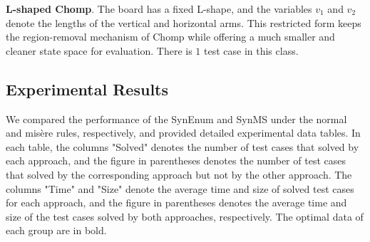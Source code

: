 \documentclass[review]{elsarticle}
\newcommand{\set}[1]{\{ #1 \}}
\newcommand{\tuple}[1]{\langle {#1} \rangle}
\newcommand{\true}{\top}
\newcommand{\statevar}{\mathcal{X}}
\newcommand{\act}{\mathcal{A}}
\newcommand{\constraint}{\mathcal{C}}
\newcommand{\estate}{\mathcal{E}}
\newcommand{\pre}{\mathtt{pre}}
\newcommand{\eff}{\mathtt{eff}}
\begin{document}
{\color{red}\textbf{L-shaped Chomp}. The board has a fixed L-shape, and the variables $v_1$ and $v_2$ denote the lengths of the vertical and horizontal arms.}
{\color{red}This restricted form keeps the region-removal mechanism of Chomp while offering a much smaller and cleaner state space for evaluation.}
{\color{red}There is $1$ test case in this class.}

\subsection{Experimental Results}
We compared the performance of the SynEnum and SynMS under the normal and mis\`{e}re rules, respectively, and provided detailed experimental data tables. In each table,
the columns "Solved" denotes the number of test cases that solved by each approach, and the figure in parentheses denotes the number of test cases that solved by the corresponding approach but not by the other approach.
The columns "Time" and "Size" denote the average time and size of solved test cases for each approach, and the figure in parentheses denotes the average time and size of the test cases solved by both approaches, respectively.
The optimal data of each group are in bold.
\end{document}
